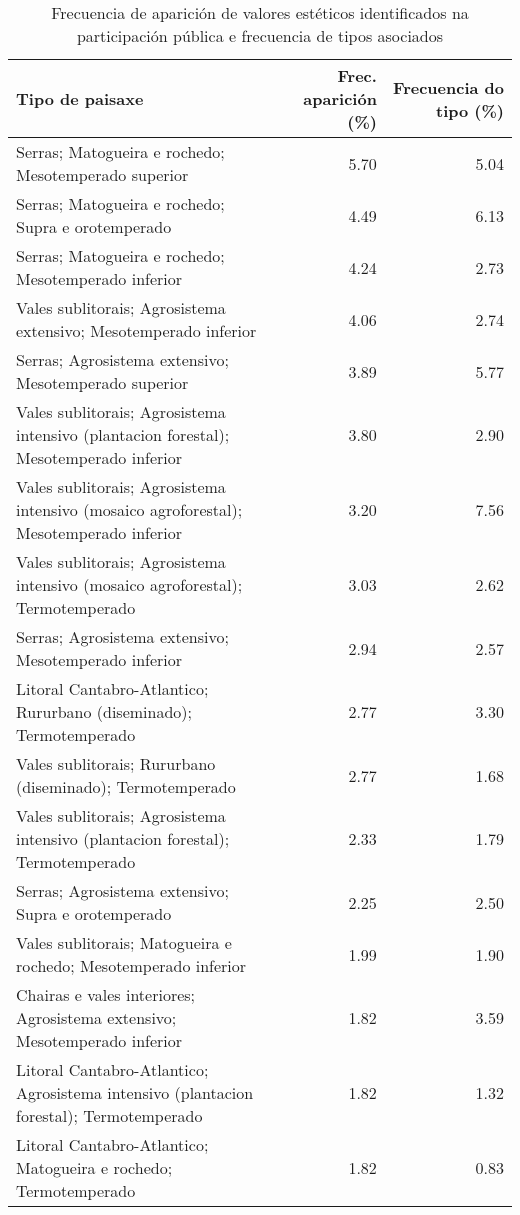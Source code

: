 \begin{table}[p]
\centering
\caption{Frecuencia de aparición de valores estéticos identificados na participación pública e frecuencia de tipos asociados} 
\label{vsixotest}
\begin{tabular}{lrr}
  \hline
Tipo de paisaxe & Frec. aparición (\%) & Frecuencia do tipo (\%) \\ 
  \hline
Serras; Matogueira e rochedo; Mesotemperado superior & 5.70 & 5.04 \\ 
  Serras; Matogueira e rochedo; Supra e orotemperado & 4.49 & 6.13 \\ 
  Serras; Matogueira e rochedo; Mesotemperado inferior & 4.24 & 2.73 \\ 
  Vales sublitorais; Agrosistema extensivo; Mesotemperado inferior & 4.06 & 2.74 \\ 
  Serras; Agrosistema extensivo; Mesotemperado superior & 3.89 & 5.77 \\ 
  Vales sublitorais; Agrosistema intensivo (plantacion forestal); Mesotemperado inferior & 3.80 & 2.90 \\ 
  Vales sublitorais; Agrosistema intensivo (mosaico agroforestal); Mesotemperado inferior & 3.20 & 7.56 \\ 
  Vales sublitorais; Agrosistema intensivo (mosaico agroforestal); Termotemperado & 3.03 & 2.62 \\ 
  Serras; Agrosistema extensivo; Mesotemperado inferior & 2.94 & 2.57 \\ 
  Litoral Cantabro-Atlantico; Rururbano (diseminado); Termotemperado & 2.77 & 3.30 \\ 
  Vales sublitorais; Rururbano (diseminado); Termotemperado & 2.77 & 1.68 \\ 
  Vales sublitorais; Agrosistema intensivo (plantacion forestal); Termotemperado & 2.33 & 1.79 \\ 
  Serras; Agrosistema extensivo; Supra e orotemperado & 2.25 & 2.50 \\ 
  Vales sublitorais; Matogueira e rochedo; Mesotemperado inferior & 1.99 & 1.90 \\ 
  Chairas e vales interiores; Agrosistema extensivo; Mesotemperado inferior & 1.82 & 3.59 \\ 
  Litoral Cantabro-Atlantico; Agrosistema intensivo (plantacion forestal); Termotemperado & 1.82 & 1.32 \\ 
  Litoral Cantabro-Atlantico; Matogueira e rochedo; Termotemperado & 1.82 & 0.83 \\ 

\end{tabular}
\end{table}
